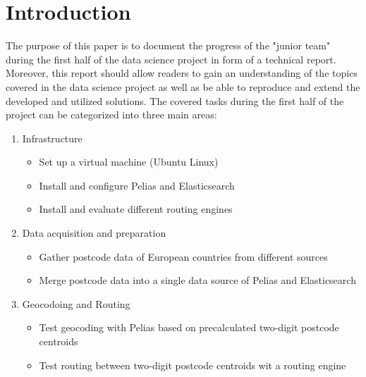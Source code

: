 
\section{Introduction}
The purpose of this paper is to document the progress of the "junior team" during the first half of the data science project in form of a technical report. Moreover, this report should allow readers to gain an understanding of the topics covered in the data science project as well as be able to reproduce and extend the developed and utilized solutions.
The covered tasks during the first half of the project can be categorized into three main areas:
\begin{enumerate}
\item Infrastructure
\begin{itemize}
\item Set up a virtual machine (Ubuntu Linux)
\item Install and configure Pelias and Elasticsearch
\item Install and evaluate different routing engines
\end{itemize}
\item Data acquisition and preparation
\begin{itemize}
\item Gather postcode data of European countries from different sources
\item Merge postcode data into a single data source of Pelias and Elasticsearch
\end{itemize}
\item Geocodoing and Routing
\begin{itemize}
\item Test geocoding with Pelias based on precalculated two-digit postcode centroids
\item Test routing between two-digit postcode centroids wit a routing engine
\end{itemize}
\end{enumerate}
